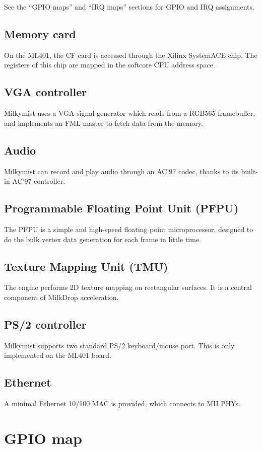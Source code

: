 \documentclass[a4paper,11pt]{article}
\begin{document}
See the ``GPIO maps'' and ``IRQ maps'' sections for GPIO and IRQ assignments.

\subsection{Memory card}
On the ML401, the CF card is accessed through the Xilinx SystemACE chip. The registers of this chip are mapped in the softcore CPU address space.

\subsection{VGA controller}
Milkymist uses a VGA signal generator which reads from a RGB565 framebuffer, and implements an FML master to fetch data from the memory.

\subsection{Audio}
Milkymist can record and play audio through an AC'97 codec, thanks to its built-in AC'97 controller.

\subsection{Programmable Floating Point Unit (PFPU)}
The PFPU is a simple and high-speed floating point microprocessor, designed to do the bulk vertex data generation for each frame in little time.

\subsection{Texture Mapping Unit (TMU)}
The engine performs 2D texture mapping on rectangular surfaces. It is a central component of MilkDrop acceleration.

\subsection{PS/2 controller}
Milkymist supports two standard PS/2 keyboard/mouse port. This is only implemented on the ML401 board.

\subsection{Ethernet}
A minimal Ethernet 10/100 MAC is provided, which connects to MII PHYs.

\section{GPIO map}
\end{document}
